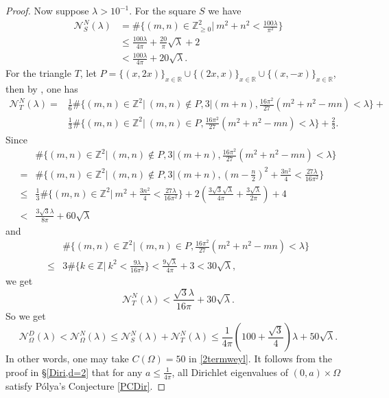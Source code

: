 \documentclass[11pt,letterpaper]{amsart}
\numberwithin{equation}{section}
\theoremstyle{plain}
\theoremstyle{plain}
\numberwithin{equation}{section}
\theoremstyle{remark}
\begin{document}
\begin{proof}
	Now suppose $\lambda > 10^{-1}$. For the square $S$ we have  
	\begin{equation*} \label{S} 
		\begin{aligned}
			\mathcal N^N_S(\lambda)&= \#\{(m,n)\in \mathbb Z_{\ge 0}^2|\ m^2+n^2< \frac{100\lambda}{\pi^2}\} \\
			&\le \frac{100\lambda}{4\pi}+ \frac{20}{\pi}\sqrt \lambda +2 \\
			&< \frac{100\lambda}{4\pi}+ 20 \sqrt \lambda.
		\end{aligned}
	\end{equation*}
	For the triangle $T$, let $P=\{(x,2x)\}_{x\in \mathbb R}\cup \{(2x,x)\}_{x\in \mathbb R} \cup \{(x,-x)\}_{x\in\mathbb R}$, then by \cite[Proposition 3]{Pin80}, one has
	\begin{equation*} \label{T} 
		\begin{aligned}
			\mathcal N^N_T(\lambda)=&\frac{1}{6}\#\{(m,n)\in \mathbb Z^2|\ (m,n)\notin P, 3|(m+n), \frac{16\pi^2}{27}(m^2+n^2-mn)<\lambda\}+ \\
			&\frac{1}{3}\#\{(m,n)\in \mathbb Z^2|\ (m,n)\in P, \frac{16\pi^2}{27}(m^2+n^2-mn)<\lambda\}+\frac{2}{3}.
		\end{aligned}
	\end{equation*}
	Since  
	\[
	\begin{aligned}
		&\#\{(m,n)\in \mathbb Z^2|\ (m,n)\notin P, 3|(m+n), \frac{16\pi^2}{27}(m^2+n^2-mn)<\lambda\} \\
		=&\#\{(m,n)\in \mathbb Z^2|\ (m,n)\notin P, 3|(m+n), (m-\frac{n}{2})^2+\frac{3n^2}{4}< \frac{27\lambda}{16\pi^2}\} \\
		\le&\frac{1}{3}\#\{(m,n)\in \mathbb Z^2|\ m^2+\frac{3n^2}{4}< \frac{27\lambda}{16\pi^2}\}+ 2(\frac{3\sqrt 3 \sqrt \lambda}{4\pi}+\frac{3\sqrt\lambda}{2\pi})+4 \\
		<& \frac{3\sqrt 3 \lambda}{8\pi}+ 60 \sqrt \lambda 
	\end{aligned}
	\]
	and 
	\[
	\begin{aligned}
		&\#\{(m,n)\in \mathbb Z^2|\ (m,n)\in P, \frac{16\pi^2}{27}(m^2+n^2-mn)<\lambda\}\\
		\le&3 \#\{k\in \mathbb Z|\ k^2< \frac{9\lambda}{16\pi^2}\}< \frac{9\sqrt{\lambda}}{4\pi}+3< 30\sqrt \lambda,
	\end{aligned}
	\]
	we get 
	\[
	\mathcal N^N_T(\lambda)< \frac{\sqrt 3\lambda}{16\pi}+ 30\sqrt\lambda.
	\]
	So we get  
	\begin{equation*}\label{ex1} 
		\mathcal N^D_\Omega(\lambda)< \mathcal N^N_\Omega(\lambda)\le \mathcal N^N_S(\lambda)+ \mathcal N^N_T(\lambda)\le \frac{1}{4\pi}(100+\frac{\sqrt 3}{4})\lambda +50 \sqrt\lambda.
	\end{equation*} 
	In other words, one may take $C(\Omega)=50$ in \eqref{2termweyl}. It follows from the proof  in \S\ref{Diri,d=2} that  for any $a \le \frac{1}{4\pi}$, all Dirichlet eigenvalues of $(0,a)\times\Omega$ satisfy P\'olya's Conjecture \eqref{PCDir}.
\end{proof}	
\end{document}
